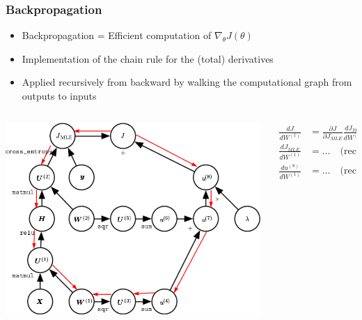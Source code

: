 \documentclass{beamer}
\begin{document}
\begin{frame}
    \frametitle{Backpropagation}

    \begin{itemize}
        \item Backpropagation = Efficient computation of $\nabla_\theta J(\theta)$
        \item Implementation of the chain rule for the (total) derivatives
        \item Applied recursively from backward by walking the computational graph from outputs to inputs
    \end{itemize}

    \begin{columns}
        \begin{column}{0.5\textwidth}
            \begin{center}
                \includegraphics[width=\textwidth]{figures/graph2.png}
            \end{center}
        \end{column}
        \begin{column}{0.5\textwidth}
            \small
            \begin{align*}
                \frac{dJ}{dW^{(1)}} &= \frac{\partial J}{\partial J_{MLE}} \frac{d J_{MLE}}{dW^{(1)}} + \frac{\partial J}{\partial u^{(8)}} \frac{d u^{(8)}}{dW^{(1)}} \\
                \frac{d J_{MLE}}{dW^{(1)}} &= \dots \quad\text{(recursive case)}\\
                \frac{d u^{(8)}}{dW^{(1)}} &= \dots \quad\text{(recursive case)}
            \end{align*}
        \end{column}
    \end{columns}



\end{frame}
\end{document}
